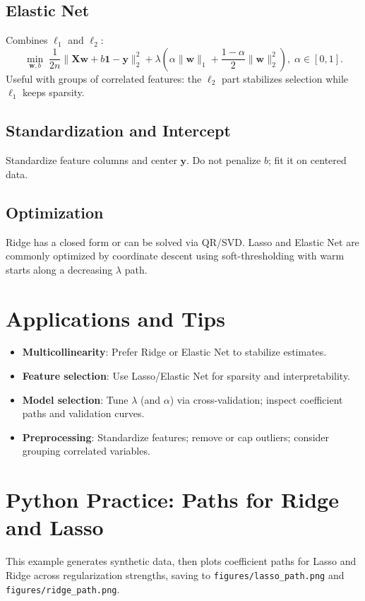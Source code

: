\documentclass{article}
\begin{document}
\subsection{Elastic Net}
Combines \(\ell_1\) and \(\ell_2\):
\begin{equation}
\min_{\mathbf{w},b}\; \frac{1}{2n}\lVert \mathbf{X}\mathbf{w} + b\mathbf{1} - \mathbf{y} \rVert_2^2 + \lambda\left( \alpha \lVert \mathbf{w} \rVert_1 + \frac{1-\alpha}{2} \lVert \mathbf{w} \rVert_2^2 \right),\; \alpha\in[0,1].
\end{equation}
Useful with groups of correlated features: the \(\ell_2\) part stabilizes selection while \(\ell_1\) keeps sparsity.

\subsection{Standardization and Intercept}
Standardize feature columns and center \(\mathbf{y}\). Do not penalize \(b\); fit it on centered data.

\subsection{Optimization}
Ridge has a closed form or can be solved via QR/SVD. Lasso and Elastic Net are commonly optimized by coordinate descent using soft-thresholding with warm starts along a decreasing \(\lambda\) path.

\section{Applications and Tips}
\begin{itemize}
  \item \textbf{Multicollinearity}: Prefer Ridge or Elastic Net to stabilize estimates.
  \item \textbf{Feature selection}: Use Lasso/Elastic Net for sparsity and interpretability.
  \item \textbf{Model selection}: Tune \(\lambda\) (and \(\alpha\)) via cross-validation; inspect coefficient paths and validation curves.
  \item \textbf{Preprocessing}: Standardize features; remove or cap outliers; consider grouping correlated variables.
\end{itemize}

\section{Python Practice: Paths for Ridge and Lasso}
This example generates synthetic data, then plots coefficient paths for Lasso and Ridge across regularization strengths, saving to \texttt{figures/lasso\_path.png} and \texttt{figures/ridge\_path.png}.
\end{document}
